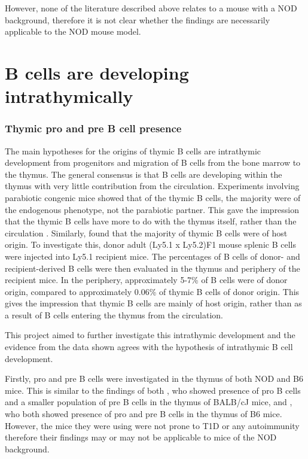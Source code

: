 However, none of the literature described above relates to a mouse with a NOD background, therefore it is not clear whether the findings are necessarily applicable to the NOD mouse model.


\section{B cells are developing intrathymically}

\subsubsection{Thymic pro and pre B cell presence}
The main hypotheses for the origins of thymic B cells are intrathymic development from progenitors and migration of B cells from the bone marrow to the thymus.
The general consensus is that B cells are developing within the thymus with very little contribution from the circulation.
Experiments involving parabiotic congenic mice showed that of the thymic B cells, the majority were of the endogenous phenotype, not the parabiotic partner. 
This gave the impression that the thymic B cells have more to do with the thymus itself, rather than the circulation \citep{Perera2013}.
Similarly, \citet{Akashi2000} found that the majority of thymic B cells were of host origin.
To investigate this, donor adult (Ly5.1 x Ly5.2)F1 mouse splenic B cells were injected into Ly5.1 recipient mice.
The percentages of B cells of donor- and recipient-derived B cells were then evaluated in the thymus and periphery of the recipient mice.
In the periphery, approximately 5-7\% of B cells were of donor origin, compared to approximately 0.06\% of thymic B cells of donor origin.
This gives the impression that thymic B cells are mainly of host origin, rather than as a result of B cells entering the thymus from the circulation. 

This project aimed to further investigate this intrathymic development and the evidence from the data shown agrees with the hypothesis of intrathymic B cell development.

Firstly, pro and pre B cells were investigated in the thymus of both NOD and B6 mice. 
This is similar to the findings of both \citet{Hashimoto2002}, who showed presence of pro B cells and a smaller population of pre B cells in the thymus of BALB/cJ mice, and \citet{Akashi2000}, who both showed presence of pro and pre B cells in the thymus of B6 mice.
However, the mice they were using were not prone to T1D or any autoimmunity therefore their findings may or may not be applicable to mice of the NOD background.


